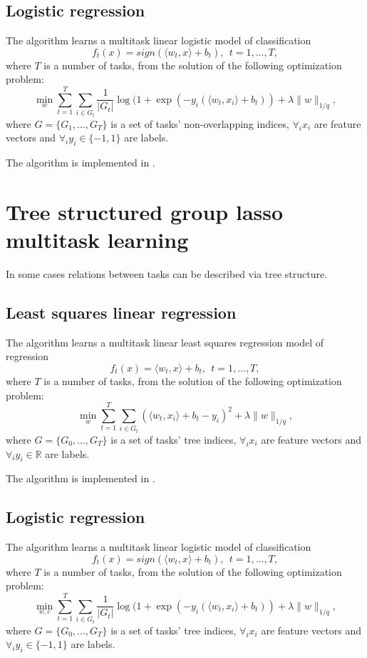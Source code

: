 \subsection{Logistic regression}

The algorithm learns a multitask linear logistic model of classification 
$$
f_t(x) = sign (\langle w_t,x \rangle + b_t), ~~ t = 1, \dots, T,
$$
where $T$ is a number of tasks, from the solution of the following optimization problem:
$$
\min_w \sum_{t=1}^{T} \sum_{i \in G_t} \frac{1}{|G_t|} \log (1+\exp\left(-y_i(\langle w_t,x_i \rangle + b_t)\right)
+ \lambda \| w \|_{1/q},
$$
where $G = \{ G_1, \dots, G_T \}$ is a set of tasks' non-overlapping indices, $\forall_i x_i$ are feature 
vectors and $\forall_i y_i \in \{-1,1\}$ are labels.

The algorithm is implemented in .

\section{Tree structured group lasso multitask learning}

In some cases relations between tasks can be described via tree structure. 

\subsection{Least squares linear regression}

The algorithm learns a multitask linear least squares regression model of regression 
$$
f_t(x) = \langle w_t,x \rangle + b_t, ~~ t = 1, \dots, T,
$$
where $T$ is a number of tasks, from the solution of the following optimization problem:
$$
\min_w \sum_{t=1}^{T} \sum_{i \in G_t} \left(\langle w_t,x_i \rangle + b_t - y_i\right)^2
+ \lambda \| w \|_{1/q},
$$
where $G = \{ G_0, \dots, G_T \}$ is a set of tasks' tree indices, $\forall_i x_i$ are feature 
vectors and $\forall_i y_i \in \mathbb{R}$ are labels.

The algorithm is implemented in .

\subsection{Logistic regression}

The algorithm learns a multitask linear logistic model of classification 
$$
f_t(x) = sign (\langle w_t,x \rangle + b_t), ~~ t = 1, \dots, T,
$$
where $T$ is a number of tasks, from the solution of the following optimization problem:
$$
\min_{w,c} \sum_{t=1}^{T} \sum_{i \in G_t} \frac{1}{|G_t|} \log (1+\exp\left(-y_i(\langle w_t,x_i \rangle + b_t)\right)
+ \lambda \| w \|_{1/q},
$$
where $G = \{ G_0, \dots, G_T \}$ is a set of tasks' tree indices, $\forall_i x_i$ are feature 
vectors and $\forall_i y_i \in \{-1,1\}$ are labels.

